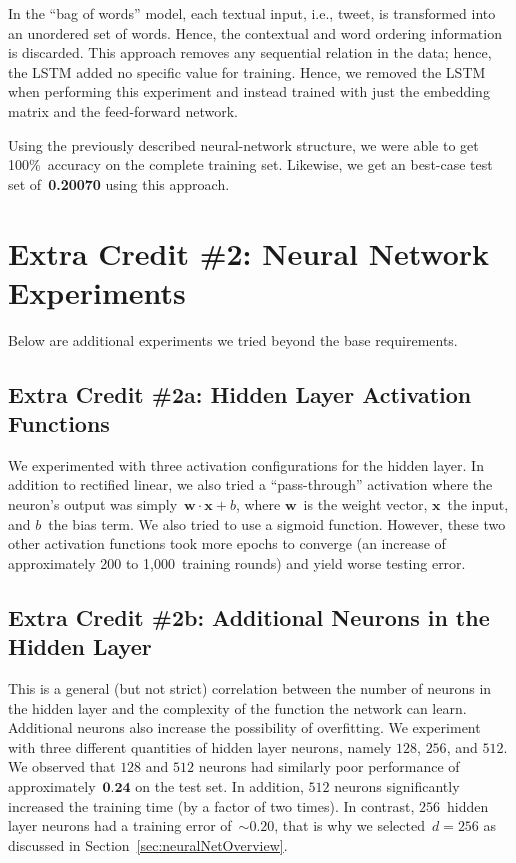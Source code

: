 \documentclass{report}
\begin{document}
  In the ``bag of words'' model, each textual input, i.e., tweet, is transformed into an unordered set of words.  Hence, the contextual and word ordering information is discarded.  This approach removes any sequential relation in the data; hence, the LSTM added no specific value for training.  Hence, we removed the LSTM when performing this experiment and instead trained with just the embedding matrix and the feed-forward network. 
  
  Using the previously described neural-network structure, we were able to get 100\%~accuracy on the complete training set.  Likewise, we get an best-case test set of~\textbf{0.20070} using this approach.
  
  \section{Extra Credit \#2: Neural Network Experiments}
  
  Below are additional experiments we tried beyond the base requirements.  
  
  \subsection{Extra Credit \#2a: Hidden Layer Activation Functions}
  
  We experimented with three activation configurations for the hidden layer.  In addition to rectified linear, we also tried a ``pass-through'' activation where the neuron's output was simply~$\textbf{w}\cdot\textbf{x} + b$, where $\textbf{w}$~is the weight vector, $\textbf{x}$~the input, and $b$~the bias term.  We also tried to use a sigmoid function.  However, these two other activation functions took more epochs to converge (an increase of approximately 200 to 1,000~training rounds) and yield worse testing error.
  
  \subsection{Extra Credit \#2b: Additional Neurons in the Hidden Layer}\label{sec:ecMoreHiddenLayerNeurons}
  
  This is a general (but not strict) correlation between the number of neurons in the hidden layer and the complexity of the function the network can learn.  Additional neurons also increase the possibility of overfitting.  We experiment with three different quantities of hidden layer neurons, namely $128$, $256$, and $512$.  We observed that $128$ and $512$ neurons had similarly poor performance of approximately~$\textbf{0.24}$ on the test set.  In addition, $512$ neurons significantly increased the training time (by a factor of two times).  In contrast, $256$~hidden layer neurons had a training error of~$\sim0.20$, that is why we selected~$d=256$ as discussed in Section~\ref{sec:neuralNetOverview}.
     
\end{document}
